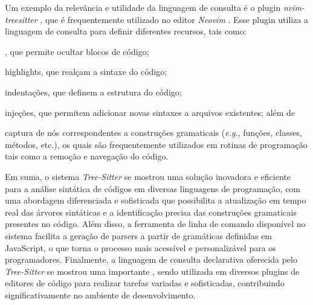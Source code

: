 \documentclass
  [11pt, a4paper, english, openright, sumario = tradicional, twoside, brazil]
  {abntex2}
\begin{document}
  Um exemplo da relevância e utilidade da linguagem de consulta é o plugin
  \textit{nvim-treesitter} \cite{nvim-treesitter-2023-nvim}, que é
  frequentemente utilizado no editor \textit{Neovim}
  \cite{neovim-2014-hyperextensible}. Esse plugin utiliza a linguagem de
  consulta para definir diferentes recursos, tais como:
  \begin{inparaenum}
    \item \textit{}, que permite ocultar blocos de código;
    \item highlights, que realçam a sintaxe do código;
    \item indentações, que definem a estrutura do código;
    \item injeções, que permitem adicionar novas sintaxes a arquivos
          existentes; além de
    \item captura de nós correspondentes a construções gramaticais
          (\textit{e.g.}, funções, classes, métodos, etc.), os quais são
          frequentemente utilizados em rotinas de programação tais como a
          remoção e navegação do código.
  \end{inparaenum}

  Em suma, o sistema \textit{Tree-Sitter} se mostrou uma solução inovadora e
  eficiente para a análise sintática de códigos em diversas linguagens de
  programação, com uma abordagem diferenciada e sofisticada que possibilita a
  atualização em tempo real das árvores sintáticas e a identificação precisa
  das construções gramaticais presentes no código. Além disso, a ferramenta de
  linha de comando disponível no sistema facilita a geração de parsers a partir
  de gramáticas definidas em JavaScript, o que torna o processo mais acessível
  e personalizável para os programadores. Finalmente, a linguagem de consulta
  declarativa oferecida pelo \textit{Tree-Sitter} se mostrou uma importante
  \textit{}, sendo utilizada em diversos plugins de editores de
  código para realizar tarefas variadas e sofisticadas, contribuindo
  significativamente no ambiente de desenvolvimento.


  \postextual
  \printbibliography
\end{document}
